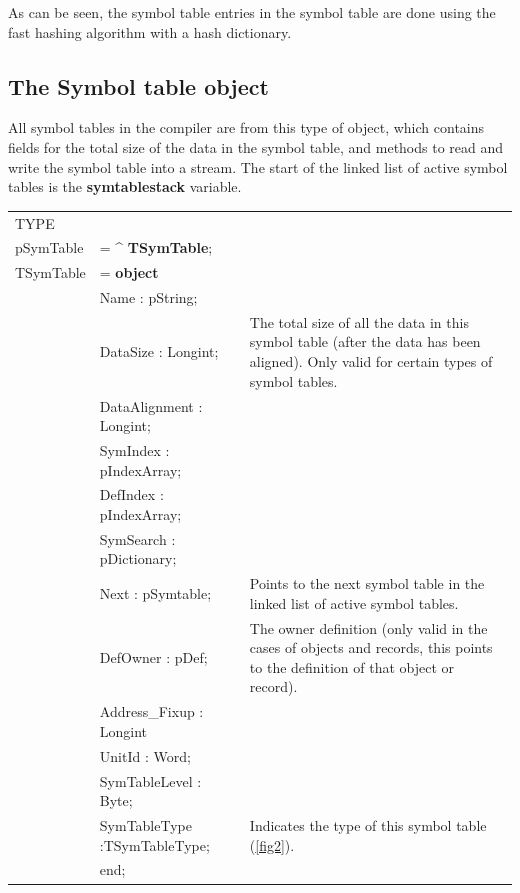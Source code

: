 \documentclass [a4paper,12pt]{article}
\begin{document}
As can be seen, the symbol table entries in the symbol table are done using
the fast hashing algorithm with a hash dictionary.

\subsection{The Symbol table object}
\label{subsec:mylabel3}

All symbol tables in the compiler are from this type of object, which
contains fields for the total size of the data in the symbol table, and
methods to read and write the symbol table into a stream. The start of the
linked list of active symbol tables is the \textbf{symtablestack} variable.

\begin{tabular*}{6.5in}{|l@{\extracolsep{\fill}}lp{}|}
\hline
\textsf{TYPE} & & \\
\xspace \textsf{pSymTable} &= \^{} \textbf{TSymTable};&  \\
\xspace \textsf{TSymTable} &= \textbf{object} & \\
& \textsf{Name : pString;}& \\
& \textsf{DataSize : Longint;}&
    The total size of all the data in this symbol table (after the data has been aligned). Only valid for certain types of symbol tables. \\
& \textsf{DataAlignment : Longint;}& \\
& \textsf{SymIndex : pIndexArray;}& \\
& \textsf{DefIndex : pIndexArray;}&  \\
& \textsf{SymSearch : pDictionary;}& \\
& \textsf{Next : pSymtable;}&
    Points to the next symbol table in the linked list of active symbol tables. \\
& \textsf{DefOwner : pDef;}&
    The owner definition (only valid in the cases of objects and records, this points to the definition of that object or record). \\
& \textsf{Address{\_}Fixup : Longint}&  \\
& \textsf{UnitId : Word;}&  \\
& \textsf{SymTableLevel : Byte;}&  \\
& \textsf{SymTableType :TSymTableType;}&
    Indicates the type of this symbol table (\ref{fig2}). \\
&\textsf{end;}&  \\
\hline
\end{tabular*}
\end{document}
